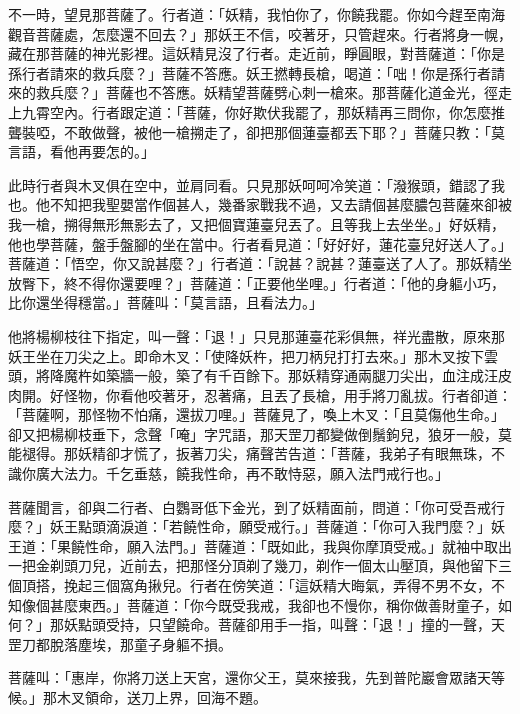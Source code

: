 不一時，望見那菩薩了。行者道：「妖精，我怕你了，你饒我罷。你如今趕至南海觀音菩薩處，怎麼還不回去？」那妖王不信，咬著牙，只管趕來。行者將身一幌，藏在那菩薩的神光影裡。這妖精見沒了行者。走近前，睜圓眼，對菩薩道：「你是孫行者請來的救兵麼？」菩薩不答應。妖王撚轉長槍，喝道：「咄！你是孫行者請來的救兵麼？」菩薩也不答應。妖精望菩薩劈心刺一槍來。那菩薩化道金光，徑走上九霄空內。行者跟定道：「菩薩，你好欺伏我罷了，那妖精再三問你，你怎麼推聾裝啞，不敢做聲，被他一槍搠走了，卻把那個蓮臺都丟下耶？」菩薩只教：「莫言語，看他再要怎的。」

此時行者與木叉俱在空中，並肩同看。只見那妖呵呵冷笑道：「潑猴頭，錯認了我也。他不知把我聖嬰當作個甚人，幾番家戰我不過，又去請個甚麼膿包菩薩來卻被我一槍，搠得無形無影去了，又把個寶蓮臺兒丟了。且等我上去坐坐。」好妖精，他也學菩薩，盤手盤腳的坐在當中。行者看見道：「好好好，蓮花臺兒好送人了。」菩薩道：「悟空，你又說甚麼？」行者道：「說甚？說甚？蓮臺送了人了。那妖精坐放臀下，終不得你還要哩？」菩薩道：「正要他坐哩。」行者道：「他的身軀小巧，比你還坐得穩當。」菩薩叫：「莫言語，且看法力。」

他將楊柳枝往下指定，叫一聲：「退！」只見那蓮臺花彩俱無，祥光盡散，原來那妖王坐在刀尖之上。即命木叉：「使降妖杵，把刀柄兒打打去來。」那木叉按下雲頭，將降魔杵如築牆一般，築了有千百餘下。那妖精穿通兩腿刀尖出，血注成汪皮肉開。好怪物，你看他咬著牙，忍著痛，且丟了長槍，用手將刀亂拔。行者卻道：「菩薩啊，那怪物不怕痛，還拔刀哩。」菩薩見了，喚上木叉：「且莫傷他生命。」卻又把楊柳枝垂下，念聲「唵」字咒語，那天罡刀都變做倒鬚鉤兒，狼牙一般，莫能褪得。那妖精卻才慌了，扳著刀尖，痛聲苦告道：「菩薩，我弟子有眼無珠，不識你廣大法力。千乞垂慈，饒我性命，再不敢恃惡，願入法門戒行也。」

菩薩聞言，卻與二行者、白鸚哥低下金光，到了妖精面前，問道：「你可受吾戒行麼？」妖王點頭滴淚道：「若饒性命，願受戒行。」菩薩道：「你可入我門麼？」妖王道：「果饒性命，願入法門。」菩薩道：「既如此，我與你摩頂受戒。」就袖中取出一把金剃頭刀兒，近前去，把那怪分頂剃了幾刀，剃作一個太山壓頂，與他留下三個頂搭，挽起三個窩角揪兒。行者在傍笑道：「這妖精大晦氣，弄得不男不女，不知像個甚麼東西。」菩薩道：「你今既受我戒，我卻也不慢你，稱你做善財童子，如何？」那妖點頭受持，只望饒命。菩薩卻用手一指，叫聲：「退！」撞的一聲，天罡刀都脫落塵埃，那童子身軀不損。

菩薩叫：「惠岸，你將刀送上天宮，還你父王，莫來接我，先到普陀巖會眾諸天等候。」那木叉領命，送刀上界，回海不題。

